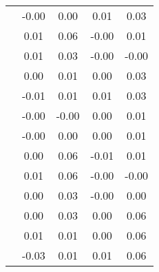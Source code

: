 \begin{table}
\begin{tabular}{c|cc|cc|}
\multicolumn{1}{|c|}{} & \multicolumn{1}{|c|}{     -0.00} & \multicolumn{1}{|c|}{      0.00} & \multicolumn{1}{|c|}{      0.01} & \multicolumn{1}{|c|}{      0.03} \\ 
\multicolumn{1}{|c|}{} & \multicolumn{1}{|c|}{      0.01} & \multicolumn{1}{|c|}{      0.06} & \multicolumn{1}{|c|}{     -0.00} & \multicolumn{1}{|c|}{      0.01} \\ 
\multicolumn{1}{|c|}{} & \multicolumn{1}{|c|}{      0.01} & \multicolumn{1}{|c|}{      0.03} & \multicolumn{1}{|c|}{     -0.00} & \multicolumn{1}{|c|}{     -0.00} \\ 
\multicolumn{1}{|c|}{} & \multicolumn{1}{|c|}{      0.00} & \multicolumn{1}{|c|}{      0.01} & \multicolumn{1}{|c|}{      0.00} & \multicolumn{1}{|c|}{      0.03} \\ 
\multicolumn{1}{|c|}{} & \multicolumn{1}{|c|}{     -0.01} & \multicolumn{1}{|c|}{      0.01} & \multicolumn{1}{|c|}{      0.01} & \multicolumn{1}{|c|}{      0.03} \\ 
\multicolumn{1}{|c|}{} & \multicolumn{1}{|c|}{     -0.00} & \multicolumn{1}{|c|}{     -0.00} & \multicolumn{1}{|c|}{      0.00} & \multicolumn{1}{|c|}{      0.01} \\ 
\multicolumn{1}{|c|}{} & \multicolumn{1}{|c|}{     -0.00} & \multicolumn{1}{|c|}{      0.00} & \multicolumn{1}{|c|}{      0.00} & \multicolumn{1}{|c|}{      0.01} \\ 
\multicolumn{1}{|c|}{} & \multicolumn{1}{|c|}{      0.00} & \multicolumn{1}{|c|}{      0.06} & \multicolumn{1}{|c|}{     -0.01} & \multicolumn{1}{|c|}{      0.01} \\ 
\multicolumn{1}{|c|}{} & \multicolumn{1}{|c|}{      0.01} & \multicolumn{1}{|c|}{      0.06} & \multicolumn{1}{|c|}{     -0.00} & \multicolumn{1}{|c|}{     -0.00} \\ 
\multicolumn{1}{|c|}{} & \multicolumn{1}{|c|}{      0.00} & \multicolumn{1}{|c|}{      0.03} & \multicolumn{1}{|c|}{     -0.00} & \multicolumn{1}{|c|}{      0.00} \\ 
\multicolumn{1}{|c|}{} & \multicolumn{1}{|c|}{      0.00} & \multicolumn{1}{|c|}{      0.03} & \multicolumn{1}{|c|}{      0.00} & \multicolumn{1}{|c|}{      0.06} \\ 
\multicolumn{1}{|c|}{} & \multicolumn{1}{|c|}{      0.01} & \multicolumn{1}{|c|}{      0.01} & \multicolumn{1}{|c|}{      0.00} & \multicolumn{1}{|c|}{      0.06} \\ 
\multicolumn{1}{|c|}{} & \multicolumn{1}{|c|}{     -0.03} & \multicolumn{1}{|c|}{      0.01} & \multicolumn{1}{|c|}{      0.01} & \multicolumn{1}{|c|}{      0.06} \\ 

\end{tabular}
\end{table}
